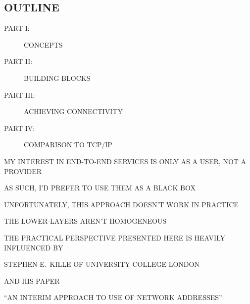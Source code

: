

\begin{bwslide}
\part*	{OUTLINE}\bf

\begin{description}
\item[PART I:]		CONCEPTS

\item[PART II:]		BUILDING BLOCKS

\item[PART III:]	ACHIEVING CONNECTIVITY

\item[PART IV:]		COMPARISON TO TCP/IP
\end{description}
\end{bwslide}


\begin{bwslide}

\begin{nrtc}
\item	MY INTEREST IN END-TO-END SERVICES IS ONLY AS A USER,
	NOT A PROVIDER

\item	AS SUCH, I'D PREFER TO USE THEM AS A BLACK BOX

\item	UNFORTUNATELY, THIS APPROACH DOESN'T WORK IN PRACTICE
    \begin{nrtc}
    \item	THE LOWER-LAYERS AREN'T HOMOGENEOUS
    \end{nrtc}

\item	THE PRACTICAL PERSPECTIVE PRESENTED HERE IS HEAVILY INFLUENCED BY
    \begin{nrtc}
    \item	STEPHEN E.~KILLE OF UNIVERSITY COLLEGE LONDON
    \end{nrtc}

\item	AND HIS PAPER
    \begin{nrtc}
    \item	``AN INTERIM APPROACH TO USE OF NETWORK ADDRESSES''
    \end{nrtc}
\end{nrtc}
\end{bwslide}


